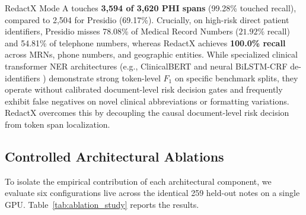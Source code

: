 \documentclass[11pt,a4paper]{article}
\begin{document}
RedactX Mode A touches \textbf{3,594 of 3,620 PHI spans} (99.28\% touched recall), compared to 2,504 for Presidio (69.17\%). Crucially, on high-risk direct patient identifiers, Presidio misses 78.08\% of Medical Record Numbers ($21.92\%$ recall) and 54.81\% of telephone numbers, whereas RedactX achieves \textbf{100.0\% recall} across MRNs, phone numbers, and geographic entities. While specialized clinical transformer NER architectures (e.g., ClinicalBERT \cite{alsentzer2019publicly} and neural BiLSTM-CRF de-identifiers \cite{dernoncourt2017identification}) demonstrate strong token-level $F_1$ on specific benchmark splits, they operate without calibrated document-level risk decision gates and frequently exhibit false negatives on novel clinical abbreviations or formatting variations. RedactX overcomes this by decoupling the causal document-level risk decision from token span localization.

\subsection{Controlled Architectural Ablations}
\label{sec:ablations}
To isolate the empirical contribution of each architectural component, we evaluate six configurations live across the identical 259 held-out notes on a single GPU. Table~\ref{tab:ablation_study} reports the results.
\end{document}
